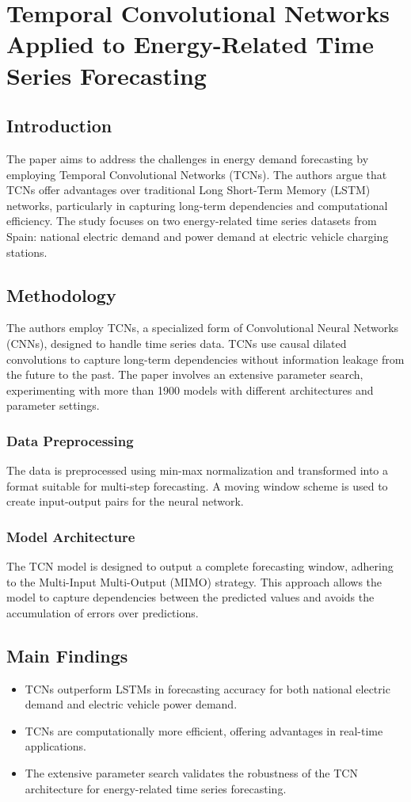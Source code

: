 \documentclass{article}
\begin{document}
\newpage
\section{Temporal Convolutional Networks Applied to Energy-Related Time Series Forecasting}

\subsection{Introduction}
The paper aims to address the challenges in energy demand forecasting by employing Temporal Convolutional Networks (TCNs). The authors argue that TCNs offer advantages over traditional Long Short-Term Memory (LSTM) networks, particularly in capturing long-term dependencies and computational efficiency. The study focuses on two energy-related time series datasets from Spain: national electric demand and power demand at electric vehicle charging stations.

\subsection{Methodology}
The authors employ TCNs, a specialized form of Convolutional Neural Networks (CNNs), designed to handle time series data. TCNs use causal dilated convolutions to capture long-term dependencies without information leakage from the future to the past. The paper involves an extensive parameter search, experimenting with more than 1900 models with different architectures and parameter settings.

\subsubsection{Data Preprocessing}
The data is preprocessed using min-max normalization and transformed into a format suitable for multi-step forecasting. A moving window scheme is used to create input-output pairs for the neural network.

\subsubsection{Model Architecture}
The TCN model is designed to output a complete forecasting window, adhering to the Multi-Input Multi-Output (MIMO) strategy. This approach allows the model to capture dependencies between the predicted values and avoids the accumulation of errors over predictions.

\subsection{Main Findings}
\begin{itemize}
    \item TCNs outperform LSTMs in forecasting accuracy for both national electric demand and electric vehicle power demand.
    \item TCNs are computationally more efficient, offering advantages in real-time applications.
    \item The extensive parameter search validates the robustness of the TCN architecture for energy-related time series forecasting.
\end{itemize}
\end{document}
